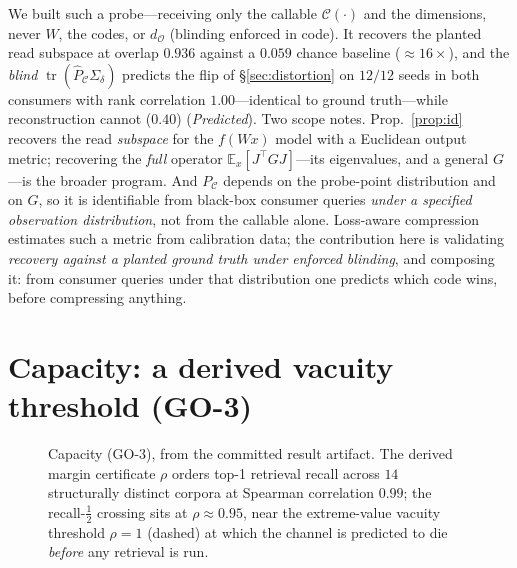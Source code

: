 \documentclass[lettersize,onecolumn]{IEEEtran}
\theoremstyle{definition}
\theoremstyle{remark}
\newcommand{\PC}{P_{\mathcal{C}}}
\newcommand{\Sd}{\Sigma_{\delta}}
\newcommand{\tr}{\operatorname{tr}}
\newcommand{\dO}{d_{\mathcal{O}}}
\newcommand{\E}{\mathbb{E}}
\begin{document}
We built such a probe---receiving only the callable $\mathcal{C}(\cdot)$ and the
dimensions, never $W$, the codes, or $\dO$ (blinding enforced in code). It recovers
the planted read subspace at overlap $0.936$ against a $0.059$ chance baseline
($\approx16\times$), and the \emph{blind} $\tr(\hat\PC\Sd)$ predicts the flip of
\S\ref{sec:distortion} on $12/12$ seeds in both consumers with rank correlation
$1.00$---identical to ground truth---while reconstruction cannot ($0.40$)
(\emph{Predicted}). Two scope notes. Prop.~\ref{prop:id} recovers the read \emph{subspace} for the
$f(Wx)$ model with a Euclidean output metric; recovering the \emph{full} operator
$\E_x[J^\top G J]$---its eigenvalues, and a general $G$---is the broader program.
And $\PC$ depends on the probe-point distribution and on $G$, so it is identifiable
from black-box consumer queries \emph{under a specified observation distribution},
not from the callable alone. Loss-aware compression estimates such a metric from
calibration data; the contribution here is validating \emph{recovery against a
planted ground truth under enforced blinding}, and composing it: from consumer
queries under that distribution one predicts which code wins, before compressing
anything.

\section{Capacity: a derived vacuity threshold (GO-3)}\label{sec:capacity}

\begin{figure}[!t]
\centering
{}
\caption{Capacity (GO-3), from the committed result artifact. The derived margin
certificate $\rho$ orders top-1 retrieval recall across $14$ structurally distinct
corpora at Spearman correlation $0.99$; the recall-$\tfrac12$ crossing sits at
$\rho\approx0.95$, near the extreme-value vacuity threshold $\rho=1$ (dashed) at which
the channel is predicted to die \emph{before} any retrieval is run.}
\label{fig:vacuity}
\end{figure}
\end{document}
